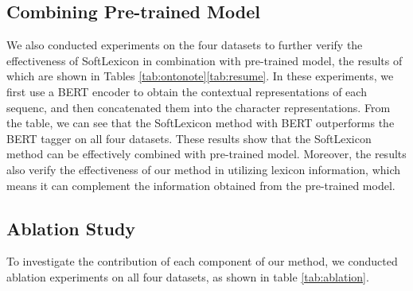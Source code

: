 \documentclass[11pt,a4paper]{article}
\begin{document}
\begin{CJK}{UTF8}{gbsn}
\subsection{Combining Pre-trained Model}
We also conducted experiments on the four datasets to further verify the effectiveness of SoftLexicon in combination with pre-trained model, the results of which are shown in Tables \ref{tab:ontonote}\ref{tab:resume}. In these experiments, we first use a BERT encoder to obtain the contextual representations of each sequenc, and then concatenated them into the character representations.
From the table, we can see that the SoftLexicon method with BERT outperforms the BERT tagger on all four datasets. These results show that the SoftLexicon method can be effectively combined with pre-trained model. Moreover, the results also verify the effectiveness of our method in utilizing lexicon information, which means it can complement the information obtained from the pre-trained model.


\begin{table}[t]
    \centering
    \caption{An ablation study of the proposed model.}
    \label{tab:ablation}
\end{table}

\subsection{Ablation Study}
To investigate the contribution of each component of our method, we conducted ablation experiments on all four datasets, as shown in table \ref{tab:ablation}.



\end{CJK}
\end{document}
